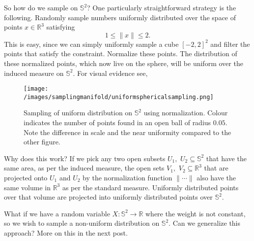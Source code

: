 So how do we sample on \(\mathbb{S}^2\)?
One particularly straightforward strategy is the following.
Randomly sample numbers uniformly distributed over the space of points \(x\in\mathbb{R}^3\) satisfying
\[
  1 \leq \| x \| \leq 2.
\]
This is easy, since we can simply uniformly sample a cube \([-2, 2]^2\) and filter the points that satisfy the constraint.
Normalize these points.
The distribution of these normalized points, which now live on the sphere, will be uniform over the induced measure on \(\mathbb{S}^2.\)
For visual evidence see,
%
\begin{figure}
  \texttt{[image: /images/samplingmanifold/uniformsphericalsampling.png]}
  \caption{Sampling of uniform distribution on \(\mathbb{S}^2\) using normalization. Colour indicates the number of points found in an open ball of radius \(0.05.\) Note the difference in scale and the near uniformity compared to the other figure.}
\end{figure}
%
Why does this work?
If we pick any two open subsets \(U_1,\) \(U_2 \subseteq \mathbb{S}^2\) that have the same area, as per the induced measure, the open sets \(V_1,\) \(V_2 \subseteq \mathbb{R}^3\) that are projected onto \(U_1\) and \(U_2\) by the normalization function \(\|\cdots\|\) also have the same volume in \(\mathbb{R}^3\) as per the standard measure.
Uniformly distributed points over that volume are projected into uniformly distributed points over \(\mathbb{S}^2.\)

What if we have a random variable \(X: \mathbb{S}^2 \to \mathbb{R}\) where the weight is not constant, so we wish to sample a non-uniform distribution on \(\mathbb{S}^2.\)
Can we generalize this approach?
More on this in the next post.
